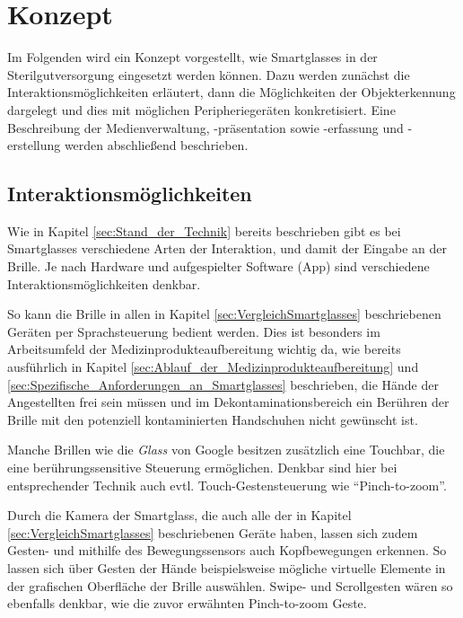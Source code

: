 %
%
%
%
%
%
\chapter{Konzept}
\label{ch:Konzept}
Im Folgenden wird ein Konzept vorgestellt, wie Smartglasses in der Sterilgutversorgung eingesetzt werden können. Dazu werden zunächst die Interaktionsmöglichkeiten erläutert, dann die Möglichkeiten der Objekterkennung dargelegt und dies mit möglichen Peripheriegeräten konkretisiert. Eine Beschreibung der Medienverwaltung, -präsentation sowie -erfassung und -erstellung werden abschließend beschrieben.
%
%
%
%
%
%
\section{Interaktionsmöglichkeiten}
\label{sec:Interaktionsmoeglichkeiten}
Wie in Kapitel \ref{sec:Stand_der_Technik} bereits beschrieben gibt es bei Smartglasses verschiedene Arten der Interaktion, und damit der Eingabe an der Brille. Je nach Hardware und aufgespielter Software (App) sind verschiedene Interaktionsmöglichkeiten denkbar. 

So kann die Brille in allen in Kapitel \ref{sec:VergleichSmartglasses} beschriebenen Geräten per Sprachsteuerung bedient werden. Dies ist besonders im Arbeitsumfeld der Medizinprodukteaufbereitung wichtig da, wie bereits ausführlich in Kapitel \ref{sec:Ablauf_der_Medizinprodukteaufbereitung} und \ref{sec:Spezifische_Anforderungen_an_Smartglasses} beschrieben, die Hände der Angestellten frei sein müssen und im Dekontaminationsbereich ein Berühren der Brille mit den potenziell kontaminierten Handschuhen nicht gewünscht ist.

Manche Brillen wie die \emph{Glass} von Google besitzen zusätzlich eine Touchbar, die eine berührungssensitive Steuerung ermöglichen. Denkbar sind hier bei entsprechender Technik auch evtl. Touch-Gestensteuerung wie \enquote{Pinch-to-zoom}.

Durch die Kamera der Smartglass, die auch alle der in Kapitel \ref{sec:VergleichSmartglasses} beschriebenen Geräte haben, lassen sich zudem Gesten- und mithilfe des Bewegungssensors auch Kopfbewegungen erkennen. So lassen sich über Gesten der Hände beispielsweise mögliche virtuelle Elemente in der grafischen Oberfläche der Brille auswählen. Swipe- und Scrollgesten wären so ebenfalls denkbar, wie die zuvor erwähnten Pinch-to-zoom Geste.

